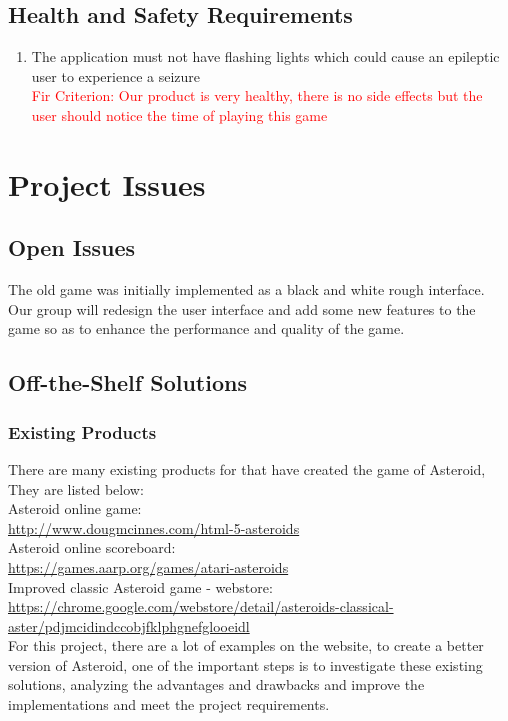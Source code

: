 \documentclass[12pt, titlepage]{article}
\begin{document}
\subsection{Health and Safety Requirements}
\begin{enumerate}
    \item The application must not have flashing lights which could cause an epileptic user to experience a seizure\\
    \textcolor{red}{Fir Criterion: Our product is very healthy, there is no side effects but the user should notice the time of playing this game}
\end{enumerate}
\section{Project Issues}

\subsection{Open Issues}
The old game was initially implemented as a black and white rough interface. Our group will redesign the user interface and add some new features to the game so as to enhance the performance and quality of the game. 


\subsection{Off-the-Shelf Solutions}
\subsubsection{Existing Products}
There are many existing products for that have created the game of Asteroid, They are listed below:\\
Asteroid online game:\\
\url{http://www.dougmcinnes.com/html-5-asteroids}\\
Asteroid online scoreboard:\\
\url{https://games.aarp.org/games/atari-asteroids}\\
Improved classic Asteroid  game - webstore:\\
\url{https://chrome.google.com/webstore/detail/asteroids-classical-aster/pdjmcidindccobjfklphgnefglooeidl}\\


For this project, there are a lot of examples on the website, to create a better version of Asteroid, one of the important steps is to investigate these existing solutions, analyzing the advantages and drawbacks and improve the implementations and meet the project requirements.
\end{document}
